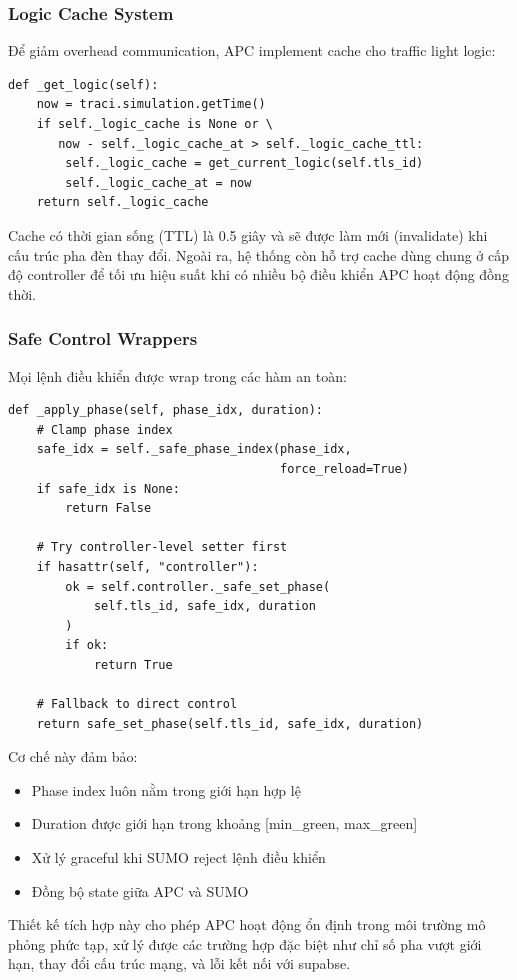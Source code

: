 \subsubsection{Logic Cache System}
Để giảm overhead communication, APC implement cache cho traffic light logic:

\begin{lstlisting}[style=py, caption={Cơ chế cache logic}]
def _get_logic(self):
    now = traci.simulation.getTime()
    if self._logic_cache is None or \
       now - self._logic_cache_at > self._logic_cache_ttl:
        self._logic_cache = get_current_logic(self.tls_id)
        self._logic_cache_at = now
    return self._logic_cache
\end{lstlisting}

Cache có thời gian sống (TTL) là 0.5 giây và sẽ được làm mới (invalidate) khi cấu trúc pha đèn thay đổi. Ngoài ra, hệ thống còn hỗ trợ cache dùng chung ở cấp độ controller để tối ưu hiệu suất khi có nhiều bộ điều khiển APC hoạt động đồng thời.

\subsubsection{Safe Control Wrappers}
Mọi lệnh điều khiển được wrap trong các hàm an toàn:

\begin{lstlisting}[style=py, caption={Safe phase control}]
def _apply_phase(self, phase_idx, duration):
    # Clamp phase index
    safe_idx = self._safe_phase_index(phase_idx, 
                                      force_reload=True)
    if safe_idx is None:
        return False
    
    # Try controller-level setter first
    if hasattr(self, "controller"):
        ok = self.controller._safe_set_phase(
            self.tls_id, safe_idx, duration
        )
        if ok:
            return True
            
    # Fallback to direct control
    return safe_set_phase(self.tls_id, safe_idx, duration)
\end{lstlisting}

Cơ chế này đảm bảo:
\begin{itemize}
    \item Phase index luôn nằm trong giới hạn hợp lệ
    \item Duration được giới hạn trong khoảng [min\_green, max\_green]
    \item Xử lý graceful khi SUMO reject lệnh điều khiển
    \item Đồng bộ state giữa APC và SUMO
\end{itemize}
Thiết kế tích hợp này cho phép APC hoạt động ổn định trong môi trường mô phỏng phức tạp, xử lý được các trường hợp đặc biệt như chỉ số pha vượt giới hạn, thay đổi cấu trúc mạng, và lỗi kết nối với supabse.
